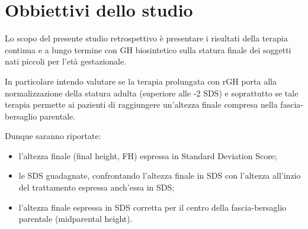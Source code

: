 







\section{Obbiettivi dello studio}

Lo scopo del presente studio retrospettivo è presentare i risultati della terapia continua e a lungo termine  con GH biosintetico sulla statura finale dei soggetti nati piccoli per l'età gestazionale.

In particolare intendo valutare se la terapia prolungata con rGH porta alla normalizzazione della statura adulta (superiore alle -2 SDS) e soprattutto se tale terapia permette ai pazienti di raggiungere un'altezza finale compresa nella fascia-bersaglio parentale. 

Dunque saranno riportate:

\begin{itemize}
\item l'altezza finale (final height, FH) espressa in Standard Deviation Score;
\item le SDS guadagnate, confrontando l'altezza finale in SDS con l'altezza all'inzio del trattamento espressa anch'essa in SDS;
\item l'altezza finale espressa in SDS corretta per il centro della fascia-bersaglio parentale (midparental height).
\end{itemize}



